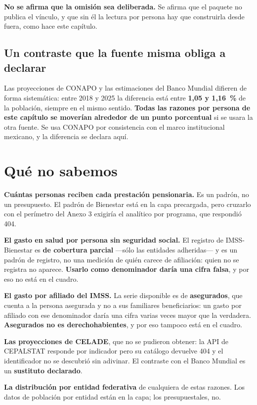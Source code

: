 \textbf{No se afirma que la omisión sea deliberada.} Se afirma que el paquete no publica el
vínculo, y que sin él la lectura por persona hay que construirla desde fuera, como hace este
capítulo.

\subsection*{Un contraste que la fuente misma obliga a declarar}

Las proyecciones de CONAPO y las estimaciones del Banco Mundial difieren de forma
sistemática: entre 2018 y 2025 la diferencia está entre \textbf{1,05 y 1,16~\%} de la
población, siempre en el mismo sentido. \textbf{Todas las razones por persona de este
capítulo se moverían alrededor de un punto porcentual} si se usara la otra fuente. Se usa
CONAPO por consistencia con el marco institucional mexicano, y la diferencia se declara aquí.

\section{Qué no sabemos}

\begin{list}{}{\setlength{\leftmargin}{1.4em}\setlength{\itemsep}{2pt}}
\item[$\bullet$] \textbf{Cuántas personas reciben cada prestación pensionaria.} Es un padrón,
no un presupuesto. El padrón de Bienestar está en la capa precargada, pero cruzarlo con el
perímetro del Anexo 3 exigiría el analítico por programa, que respondió 404.
\item[$\bullet$] \textbf{El gasto en salud por persona sin seguridad social.} El registro de
IMSS-Bienestar es \textbf{de cobertura parcial} ---sólo las entidades adheridas--- y es un
padrón de registro, no una medición de quién carece de afiliación: quien no se registra no
aparece. \textbf{Usarlo como denominador daría una cifra falsa}, y por eso no está en el
cuadro.
\item[$\bullet$] \textbf{El gasto por afiliado del IMSS.} La serie disponible es de
\textbf{asegurados}, que cuenta a la persona asegurada y no a sus familiares beneficiarios:
un gasto por afiliado con ese denominador daría una cifra varias veces mayor que la
verdadera. \textbf{Asegurados no es derechohabientes}, y por eso tampoco está en el cuadro.
\item[$\bullet$] \textbf{Las proyecciones de CELADE}, que no se pudieron obtener: la API de
CEPALSTAT responde por indicador pero su catálogo devuelve 404 y el identificador no se
descubrió sin adivinar. El contraste con el Banco Mundial es un \textbf{sustituto declarado}.
\item[$\bullet$] \textbf{La distribución por entidad federativa} de cualquiera de estas
razones. Los datos de población por entidad están en la capa; los presupuestales, no.
\end{list}

